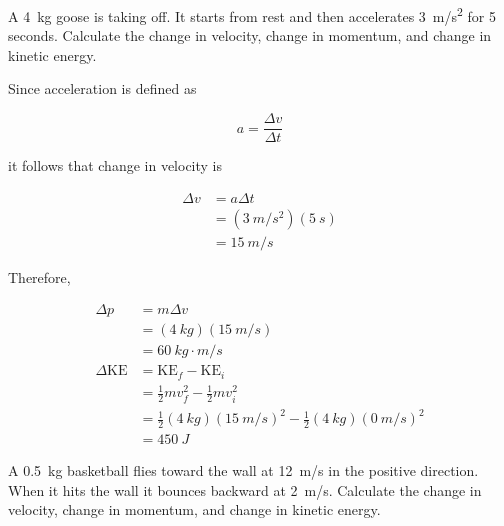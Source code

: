 \documentclass[]{exam}
\begin{document}
\begin{questions}
\question 
A \SI{4}{kg} goose is taking off. It starts from rest and then accelerates \SI{3}{m/s^2} for 5 seconds. Calculate the change in velocity, change in momentum, and change in kinetic energy.

\begin{solution}
Since acceleration is defined as

\begin{equation*}
    a = \frac{\Delta v}{\Delta t}
\end{equation*}

it follows that change in velocity is

\vspace{-1em}
\begin{align*}
    \Delta v &= a \Delta t \\[1ex]
    &= (\SI{3}{m/s^2})(\SI{5}{s}) \\[1ex]
    &= \boxed{\SI{15}{m/s}}
\end{align*}
\vspace{-1em}

Therefore,

\begin{align*}
    \Delta p &= m \Delta v \\[1ex]
    &= (\SI{4}{kg})(\SI{15}{m/s}) \\[1ex]
    &= \boxed{\SI{60}{kg\cdot m/s}} \\[2ex]
    \Delta \mathrm{KE} &= \mathrm{KE}_f - \mathrm{KE}_i \\[1ex]
    &= \frac{1}{2}m v_f^2 - \frac{1}{2}mv_i^2 \\[1ex]
    &= \frac{1}{2}(\SI{4}{kg})(\SI{15}{m/s})^2 - \frac{1}{2}(\SI{4}{kg}) (\SI{0}{m/s})^2 \\[1ex]
    &= \boxed{\SI{450}{J}}
\end{align*}
\end{solution}


\ifprintanswers
    \clearpage
\fi

\question
A \SI{0.5}{kg} basketball flies toward the wall at \SI{12}{m/s} in the positive direction. When it hits the wall it bounces backward at \SI{2}{m/s}. Calculate the change in velocity, change in momentum, and change in kinetic energy. 


\end{questions}
\end{document}
